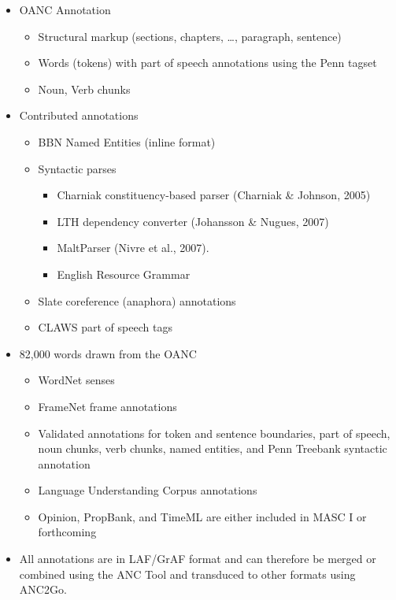 \documentclass[a4paper,landscape,headrule,footrule,dvips]{foils}
\begin{document}
\begin{CJK}{UTF8}{min}
\begin{itemize}\addtolength{\itemsep}{-1ex}
\item OANC Annotation
  \begin{itemize}
  \item  Structural markup (sections, chapters, \ldots, paragraph, sentence)
  \item  Words (tokens) with part of speech annotations using the Penn tagset
  \item  Noun, Verb chunks
\end{itemize}
\item Contributed annotations
  \begin{itemize}
  \item BBN Named Entities (inline format)
  \item Syntactic parses
    \begin{itemize}
    \item Charniak constituency-based parser (Charniak \& Johnson, 2005)
    \item LTH dependency converter (Johansson \& Nugues, 2007)
    \item MaltParser (Nivre et al., 2007).
    \item English Resource Grammar \citep{Flickinger:2008}
    \end{itemize}
  \item Slate coreference (anaphora) annotations
  \item CLAWS part of speech tags
  \end{itemize}
\end{itemize}


\begin{itemize}
\item 82,000 words drawn from the OANC
  \begin{itemize}
  \item WordNet senses
  \item FrameNet frame annotations
  \item Validated annotations for token and sentence boundaries, part of speech, noun chunks, verb chunks, named entities, and Penn Treebank syntactic annotation
  \item Language Understanding Corpus annotations
  \item Opinion, PropBank, and TimeML are either included in MASC I or forthcoming
  \end{itemize}
\item  All annotations are in LAF/GrAF format and can therefore be merged or combined using the ANC Tool and transduced to other formats using ANC2Go. 
\end{itemize}
  

\end{CJK}
\end{document}
